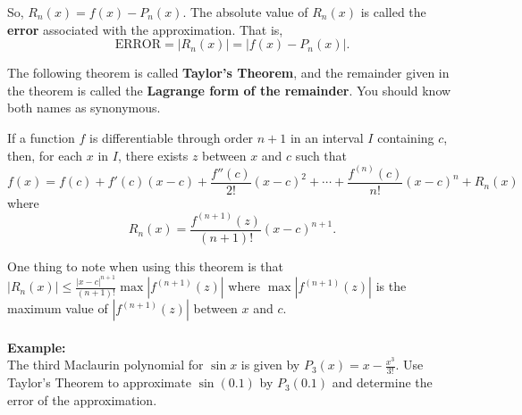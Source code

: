 \documentclass[addpoints, 12pt]{exam}
\begin{document}
\vspace{.2in}

So, $\displaystyle R_n(x)=f(x)-P_n(x)$. The absolute value of $\displaystyle R_n(x)$ is called the \textbf{error} associated with the approximation. That is,
\[\text{ERROR}=|R_n(x)|=|f(x)-P_n(x)|.\]

The following theorem is called \textbf{Taylor's Theorem}, and the remainder given in the theorem is called the \textbf{Lagrange form of the remainder}. You should know both names as synonymous.

\begin{tcolorbox}[title= TAYLOR'S THEOREM,black,sharp corners,colback=white,colbacktitle=white,coltitle=black]

    If a function $f$ is differentiable through order $n+1$ in an interval $I$ containing $c$, then, for each $x$ in $I$, there exists $z$ between $x$ and $c$ such that
    \[f(x)=f(c)+f'(c)(x-c)+\frac{f''(c)}{2!}(x-c)^2+\cdots+\frac{f^{(n)}(c)}{n!}(x-c)^n+R_n(x)\]
    where
    \[R_n(x)=\frac{f^{(n+1)}(z)}{(n+1)!}(x-c)^{n+1}.\]
    
\end{tcolorbox}
\vspace{.1in}
One thing to note when using this theorem is that $\displaystyle \left|R_n(x)\right|\le\frac{|x-c|^{n+1}}{(n+1)!}\max\left|f^{(n+1)}(z)\right|$ where $\max\left|f^{(n+1)}(z)\right|$ is the maximum value of $\left|f^{(n+1)}(z)\right|$ between $x$ and $c$.\\
\\
\noindent\textbf{Example:}\\
The third Maclaurin polynomial for $\sin x$ is given by $\displaystyle P_3(x)=x-\frac{x^3}{3!}$. Use Taylor's Theorem to approximate $\sin(0.1)$ by $P_3(0.1)$ and determine the error of the approximation.


\newpage
\end{document}
